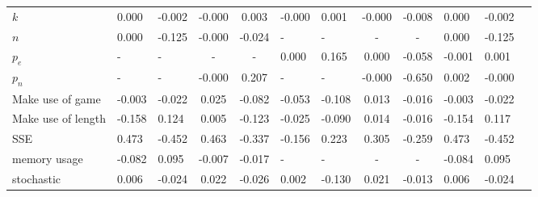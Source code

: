 \begin{tabular}{lggccggccggg}
$k$                  &  0.000 & -0.002 &  -0.000 &   0.003 &  -0.000 &   0.001 &  -0.000 &  -0.008 &   0.000 & -0.002 \\
$n$                  &  0.000 & -0.125 &  -0.000 &  -0.024 &       - &       - &       - &       - &   0.000 & -0.125 \\
$p_e$                &      - &      - &        - &     - &    0.000 &   0.165 &   0.000 &  -0.058 &  -0.001 &  0.001 \\
$p_n$                &      - &      - &  -0.000 &   0.207 &       - &       - &  -0.000 &  -0.650 &   0.002 & -0.000 \\
Make use of game     & -0.003 & -0.022 &   0.025 &  -0.082 &  -0.053 &  -0.108 &   0.013 &  -0.016 &  -0.003 & -0.022 \\
Make use of length   & -0.158 &  0.124 &   0.005 &  -0.123 &  -0.025 &  -0.090 &   0.014 &  -0.016 &  -0.154 &  0.117 \\
SSE                  &  0.473 & -0.452 &   0.463 &  -0.337 &  -0.156 &   0.223 &   0.305 &  -0.259 &   0.473 & -0.452 \\
memory usage         & -0.082 &  0.095 &  -0.007 &  -0.017 &       - &     - &     - &           - &  -0.084 &  0.095 \\
stochastic           &  0.006 & -0.024 &   0.022 &  -0.026 &   0.002 &  -0.130 &   0.021 &  -0.013 &   0.006 & -0.024 \\
\bottomrule
\end{tabular}
